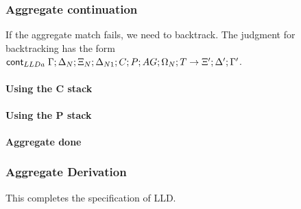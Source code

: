 

\subsubsection{Aggregate continuation}

If the aggregate match fails, we need to backtrack. The judgment for
backtracking has the form $\mathsf{cont}_{LLDa} \; \Gamma; \Delta_N; \Xi_N; \Delta_{N1}; C; P;
AG; \Omega_N; T \rightarrow \Xi'; \Delta'; \Gamma'$.

\paragraph{Using the C stack}



\paragraph{Using the P stack}



\paragraph{Aggregate done}



\subsubsection{Aggregate Derivation}



This completes the specification of LLD.
